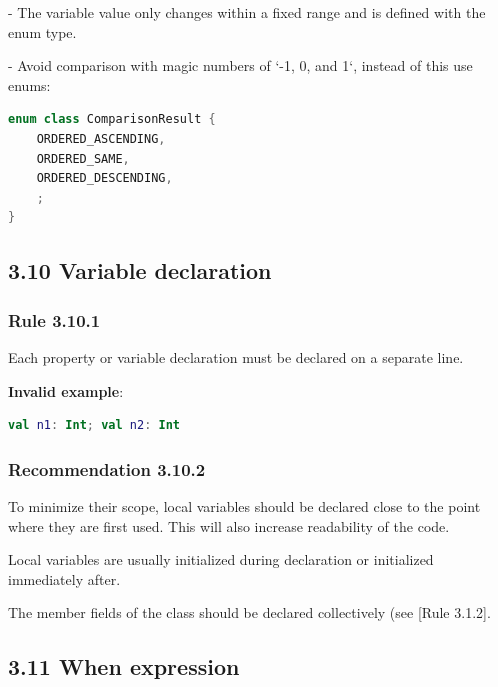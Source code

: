 {{{{- The variable value only changes within a fixed range and is defined with the enum type.

- Avoid comparison with magic numbers of `-1, 0, and 1`, instead of this use enums:



\begin{lstlisting}[language=Kotlin]
enum class ComparisonResult {
    ORDERED_ASCENDING,
    ORDERED_SAME,
    ORDERED_DESCENDING,
    ;
}
\end{lstlisting}


\subsection*{\textbf{3.10 Variable declaration}}

\subsubsection*{\textbf{Rule 3.10.1}}
\leavevmode\newline



Each property or variable declaration must be declared on a separate line.



\textbf{Invalid example}:

\begin{lstlisting}[language=Kotlin]
val n1: Int; val n2: Int
\end{lstlisting}


\subsubsection*{\textbf{Recommendation 3.10.2}}
\leavevmode\newline

To minimize their scope, local variables should be declared close to the point where they are first used. This will also increase readability of the code.

Local variables are usually initialized during declaration or initialized immediately after.

The member fields of the class should be declared collectively (see [Rule 3.1.2].



\subsection*{\textbf{3.11 When expression}}

}}}}
